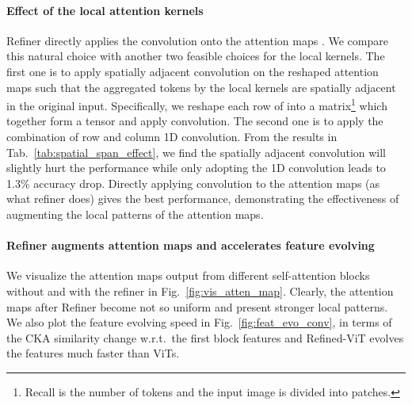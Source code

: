 \paragraph{Effect of the local attention kernels }  
Refiner directly applies  
the  convolution   onto the attention maps .
We compare this natural choice with another two feasible choices for the local kernels. The first one is to  apply spatially adjacent convolution on the  reshaped attention maps such that  the aggregated tokens by the local kernels  are spatially adjacent in the original input. Specifically,  
we reshape each row of  into a  matrix\footnote{Recall  is the number of tokens and the input image is divided into  patches.}  which together form a   tensor and apply  convolution.  
The second one is to apply the combination of row and column 1D convolution. From the results in Tab.~\ref{tab:spatial_span_effect},   we find the spatially adjacent convolution will slightly hurt the performance while only adopting the 1D convolution   leads to 1.3\% accuracy drop. Directly applying convolution to the attention maps (as what refiner does) gives the best performance, demonstrating the effectiveness of augmenting the local patterns of the attention maps.

















\paragraph{Refiner augments attention maps and accelerates feature evolving} We visualize the attention maps output from different self-attention blocks without and with the refiner in Fig.~\ref{fig:vis_atten_map}. Clearly, the attention maps after Refiner become not so uniform and present stronger local patterns. We also plot the feature evolving speed in Fig.~\ref{fig:feat_evo_conv},  in terms of the CKA similarity change w.r.t.\ the first block features and Refined-ViT evolves the features much faster than ViTs.

